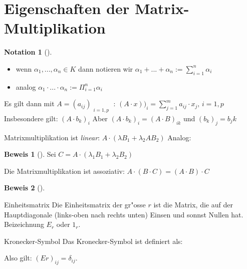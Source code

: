 \documentclass[oneside,fontsize=11pt,paper=a4,BCOR=0mm,DIV=12,automark,headsepline]{scrbook}
\theoremstyle{remark}
\theoremstyle{definition}
\newtheorem*{notation}{Notation}
\theoremstyle{definition}
\newtheorem*{prof}{Beweis}
\theoremstyle{remark}
\begin{document}
\section{Eigenschaften der Matrix-Multiplikation}
\label{sec:org8eaaee0}
\begin{notation}[] \label{}
\begin{itemize}
\item wenn \(\alpha_1,...,\alpha_n\in K\) dann notieren wir \(\alpha_1+...+\alpha_n :=
   \sum_{i=1}^{n}{\alpha_i}\)
\item analog \(\alpha_1\cdot ...\cdot\alpha_n := \Pi_{i=1}^{n}{\alpha_i}\)
\end{itemize}
\end{notation}

\begin{relation}
Es gilt dann mit \(A=(a_{ij})_{\substack{i=1,p}}\) : \((A\cdot
x))_i=\sum_{j=1}^{m}{a_{ij}\cdot x_j,\, i=1,p}\) \\

Insbesondere gilt: \((A\cdot b_k)_i\) Aber \((A\cdot b_k)_i = (A\cdot B)_{ik}\) und \((b_k)_j=b_jk\)
\end{relation}

\begin{relation}
Matrixmultiplikation ist \emph{linear}: \(A\cdot (\lambda B_1 + \lambda_2 A B_2)\)
Analog:
\end{relation}

\begin{prof}[] \label{}
Sei \(C=A\cdot (\lambda_1 B_1 + \lambda_2 B_2)\)
\end{prof}

\begin{relation}
Die Matrixmultiplikation ist assoziativ: \(A\cdot (B\cdot C)=(A\cdot B)\cdot C\)
\end{relation}

\begin{prof}[] \label{}

\end{prof}

\begin{definition}{Einheitsmatrix}{}
Die Einheitsmatrix der gr"osse \(r\) ist die Matrix, die auf der Hauptdiagonale
(links-oben nach rechts unten) Einsen und sonnst Nullen hat. Beizeichnung \(E_r\)
oder \(1_r\).
\end{definition}

\begin{definition}{Kronecker-Symbol}{}
Das Kronecker-Symbol ist definiert als: 

Also gilt: \((Er)_{ij}=\delta_{ij}\).
\end{definition}
\end{document}

